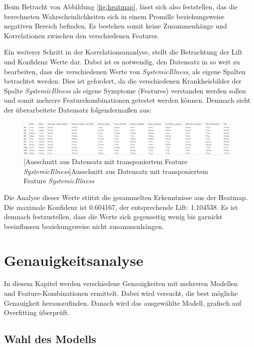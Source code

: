 \documentclass[13pt,a4paper, listof=entryprefix, bibliography=totocnumbered,toc=listofnumbered,lof=listofnumbered]{scrartcl}
\begin{document}
Beim Betracht von Abbildung \ref{fig:heatmap}, lässt sich also feststellen, das die berechneten Wahrscheinlichkeiten sich in einem Promille beziehungsweise 
negativen Bereich befinden. Es bestehen somit keine Zusammenhänge und Korrelationen zwischen den verschiedenen Features. 

Ein weiterer Schritt in der Korrelationsananlyse, stellt die Betrachtung der Lift und Konfidenz Werte dar. Dabei ist es notwendig, den 
Datensatz in so weit zu bearbeiten, dass die verschiedenen Werte von \textit{Systemic\textunderscore Illness}, als eigene Spalten betrachtet werden. 
Dies ist gefordert, da die verschiedenen Krankheisbilder der Spalte \textit{Systemic\textunderscore Illness} als eigene Symptome (Features) verstanden werden sollen und somit mehrere Featurekombinationen 
getestet werden können. Demnach sieht der überarbeitete Datensatz folgendermaßen aus: 

	\begin{figure}[H]
		\centering
		\includegraphics[width=0.8\linewidth]{Bilder/tranp_df.png}
		[Ausschnitt aus Datensatz mit transponiertem Feature \textit{Systemic\textunderscore Illness}]{Ausschnitt aus Datensatz mit transponiertem Feature \textit{Systemic\textunderscore Illness}}
		\label{fig:transp_feature}
	\end{figure}

Die Analyse dieser Werte stützt die gesammelten Erkenntnisse aus der Heatmap. Die maximale Konfidenz ist 0.604167, der entsprechende Lift:
1.104538. Es ist demnach festzustellen, dass die Werte sich gegenseitig wenig bis garnicht beeinflussen beziehungsweise nicht zusammenhängen. 


	\section{Genauigkeitsanalyse}
		\label{ch:genauigkeit_analyse}

In diesem Kapitel werden verschiedene Genauigkeiten mit mehreren Modellen und Feature-Kombinationen ermittelt. Dabei wird versucht, die best mögliche Genauigkeit herauszufinden. 
Danach wird das ausgewählte Modell, grafisch auf Overfitting überprüft.  

	\subsection{Wahl des Modells}
		\label{ch:wahl_modell}
\end{document}
